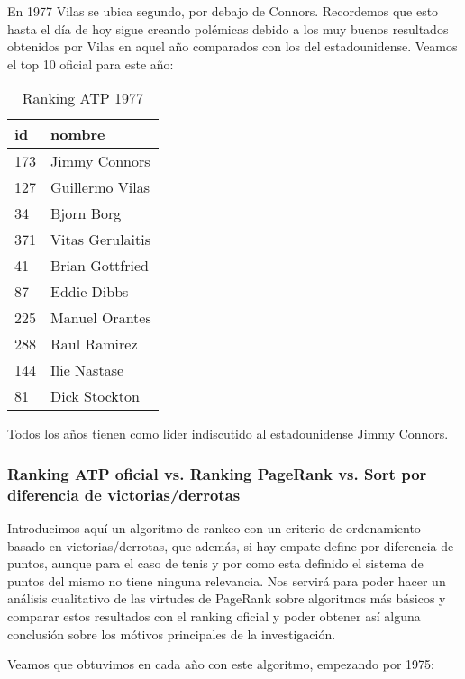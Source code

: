 En 1977 Vilas se ubica segundo, por debajo de Connors. Recordemos que esto hasta el día de hoy sigue creando polémicas debido a los muy buenos resultados obtenidos por Vilas en aquel año comparados con los del estadounidense.
Veamos el top 10 oficial para este año:

\begin{table}[H]
\label{my-label}
\begin{tabular}{ll}
\hline
id  & nombre \\ \hline
173 & Jimmy Connors \\
127 & Guillermo Vilas \\
34  & Bjorn Borg \\
371 & Vitas Gerulaitis \\
41  & Brian Gottfried \\
87  & Eddie Dibbs \\
225 & Manuel Orantes \\
288 & Raul Ramirez \\
144 & Ilie Nastase \\
81  & Dick Stockton \\ \hline 
\end{tabular}
\centering
\caption{Ranking ATP 1977}
\end{table}

Todos los años tienen como lider indiscutido al estadounidense Jimmy Connors.

\subsubsection{Ranking ATP oficial vs. Ranking PageRank vs. Sort por diferencia de victorias/derrotas}

Introducimos aquí un algoritmo de rankeo con un criterio de ordenamiento basado en victorias/derrotas, que además, si hay empate define por diferencia de puntos, aunque para el caso de tenis y por como esta definido el sistema de puntos del mismo no tiene ninguna relevancia. Nos servirá para poder hacer un análisis cualitativo de las virtudes de PageRank sobre algoritmos más básicos y comparar estos resultados con el ranking oficial y poder obtener así alguna conclusión sobre los mótivos principales de la investigación.

Veamos que obtuvimos en cada año con este algoritmo, empezando por 1975:

